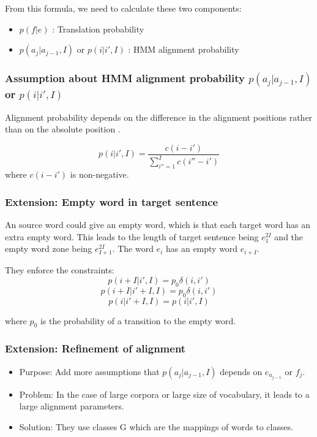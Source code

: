 \documentclass{article}
\begin{document}
From this formula, we need to calculate these two components:
\begin{itemize}
\item $ p(f | e) $ : Translation probability
\item $p(a_j | a_{j-1}, I)$ or $p(i | i', I)$ : HMM alignment probability
\end{itemize}

\subsubsection{Assumption about HMM alignment probability $p(a_j | a_{j-1}, I)$ or $p(i | i', I)$}
Alignment probability depends on the difference in the alignment positions rather than on the absolute position \cite{Vogel1996HMM}.

\begin{equation}
p(i | i', I) = \frac{c(i - i')}{\sum_{i''=1}^I c(i'' - i')}
\end{equation}
where $c(i - i')$ is non-negative.

\subsubsection{Extension: Empty word in target sentence}
An source word could give an empty word, which is that each target word has an extra empty word. This leads to the length of target sentence being $e_{1}^{2I}$ and the empty word zone being $e_{I+1}^{2I}$. The word $e_{i}$ has an empty word $e_{i+I}$.

They enforce the constraints:
\begin{equation}
p(i + I | i', I) = p_{0} \delta(i, i')
\end{equation}
\begin{equation}
p(i + I | i' + I, I) = p_{0} \delta(i, i')
\end{equation}
\begin{equation}
p(i | i' + I, I) = p(i | i', I )
\end{equation}

where $p_{0}$ is the probability of a transition to the empty word.

\subsubsection{Extension: Refinement of alignment}

\begin{itemize}
\item Purpose: Add more assumptions that $p(a_j | a_{j-1}, I)$ depends on $e_{a_{j -1}}$ or $f_j$.
\item Problem: In the case of large corpora or large size of vocabulary, it leads to a large alignment parameters.
\item Solution: They use classes G which are the mappings of words to classes.
\end{itemize}
\end{document}
